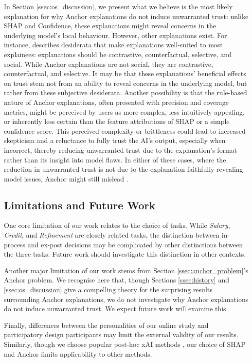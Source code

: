 In Section \ref{ssec:os_discussion}, we present what we believe is the most likely explanation for why Anchor explanations do not induce unwarranted trust: unlike SHAP and Confidence, these explanations might reveal concerns in the underlying model's local behaviour. However, other explanations exist. For instance, \textcite{miller_explanation_2017} describes desiderata that make explanations well-suited to most explainees: explanations should be contrastive, counterfactual, selective, and social. While Anchor explanations are not social, they are contrastive, counterfactual, and selective. It may be that these explanations' beneficial effects on trust stem not from an ability to reveal concerns in the underlying model, but rather from these subjective desiderata. Another possibility is that the rule-based nature of Anchor explanations, often presented with precision and coverage metrics, might be perceived by users as more complex, less intuitively appealing, or inherently less certain than the feature attributions of SHAP or a simple confidence score. This perceived complexity or brittleness could lead to increased skepticism and a reluctance to fully trust the AI's output, especially when incorrect, thereby reducing unwarranted trust due to the explanation's format rather than its insight into model flaws. In either of these cases, where the reduction in unwarranted trust is not due to the explanation faithfully revealing model issues, Anchor might still mislead \cite{Lipton}.

\subsection{Limitations and Future Work}
One core limitation of our work relates to the choice of tasks. While \emph{Salary}, \emph{Credit}, and \emph{Refinement} are closely related tasks, the distinction between in-process and ex-post decisions may be complicated by other distinctions between the three tasks. Future work should investigate this distinction in other contexts.

Another major limitation of our work stems from Section \ref{ssec:anchor_problem}'s Anchor problem. We recognise here that, though Sections \ref{ssec:history} and \ref{ssec:os_discussion} give a compelling theory for the surprising results surrounding Anchor explanations, we do not investigate why Anchor explanations do not induce unwarranted trust. We expect future work will examine this.

Finally, differences between the personalities of our online study and participatory design participants may limit the external validity of our results. Similarly, though we choose popular post-hoc xAI methods \cite{barocas_hidden_2020,kumar_problems_2020,weerts_human-grounded_2019,ribeiro_nothing_2016}, our choice of SHAP and Anchor limits applicability to other methods.

